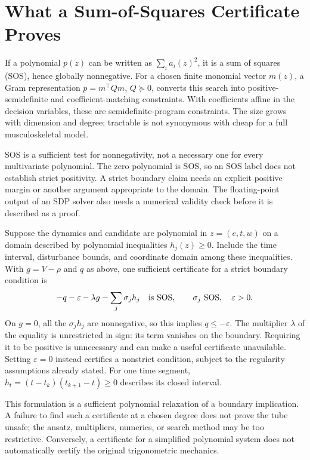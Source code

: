 \documentclass[12pt, openany]{book}
\theoremstyle{plain}
\begin{document}
\section{What a Sum-of-Squares Certificate Proves}

If a polynomial $p(z)$ can be written as $\sum_i a_i(z)^2$, it is a sum of squares (SOS), hence globally nonnegative. For a chosen finite monomial vector $m(z)$, a Gram representation $p=m^\top Qm$, $Q\succeq0$, converts this search into positive-semidefinite and coefficient-matching constraints. With coefficients affine in the decision variables, these are semidefinite-program constraints. The size grows with dimension and degree; tractable is not synonymous with cheap for a full musculoskeletal model.

SOS is a sufficient test for nonnegativity, not a necessary one for every multivariate polynomial. The zero polynomial is SOS, so an SOS label does not establish strict positivity. A strict boundary claim needs an explicit positive margin or another argument appropriate to the domain. The floating-point output of an SDP solver also needs a numerical validity check before it is described as a proof.

Suppose the dynamics and candidate are polynomial in $z=(e,t,w)$ on a domain described by polynomial inequalities $h_j(z)\geq0$. Include the time interval, disturbance bounds, and coordinate domain among these inequalities. With $g=V-\rho$ and $q$ as above, one sufficient certificate for a strict boundary condition is
\begin{equation}
 -q-\varepsilon-\lambda g-\sum_j\sigma_jh_j\quad\hbox{is SOS},
 \qquad \sigma_j\ \hbox{SOS},\quad\varepsilon>0.
 \label{eq:funnel_sos_certificate}
\end{equation}
On $g=0$, all the $\sigma_jh_j$ are nonnegative, so this implies $q\leq-\varepsilon$. The multiplier $\lambda$ of the equality is unrestricted in sign: its term vanishes on the boundary. Requiring it to be positive is unnecessary and can make a useful certificate unavailable. Setting $\varepsilon=0$ instead certifies a nonstrict condition, subject to the regularity assumptions already stated. For one time segment, $h_t=(t-t_k)(t_{k+1}-t)\geq0$ describes its closed interval.

This formulation is a sufficient polynomial relaxation of a boundary implication. A failure to find such a certificate at a chosen degree does not prove the tube unsafe; the ansatz, multipliers, numerics, or search method may be too restrictive. Conversely, a certificate for a simplified polynomial system does not automatically certify the original trigonometric mechanics.
\end{document}

